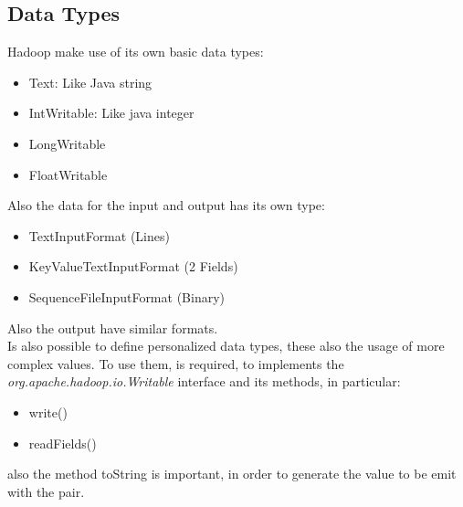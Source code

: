 \documentclass[12pt]{article}
\begin{document}
\subsection{Data Types}
Hadoop make use of its own basic data types:
\begin{itemize}
  \item Text: Like Java string
  \item IntWritable: Like java integer
  \item LongWritable
  \item FloatWritable
\end{itemize}
Also the data for the input and output has its own type:
\begin{itemize}
  \item TextInputFormat (Lines)
  \item KeyValueTextInputFormat (2 Fields)
  \item SequenceFileInputFormat (Binary)
\end{itemize}
Also the output have similar formats.\\
Is also possible to define personalized data types, these also the usage of more complex values. To use them, is required, to implements the \textit{org.apache.hadoop.io.Writable} interface and its methods, in particular:
\begin{itemize}
  \item write()
  \item readFields()
\end{itemize}
also the method toString is important, in order to generate the value to be emit with the pair.
\end{document}
